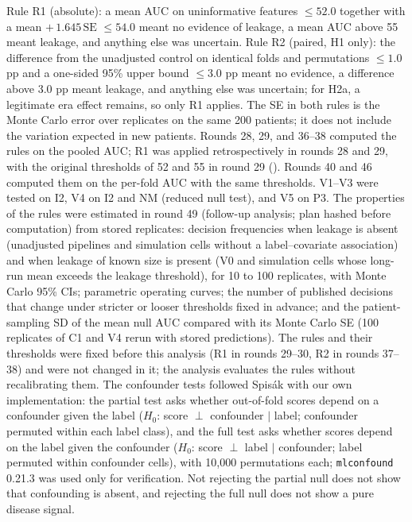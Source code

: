 

Rule R1 (absolute): a mean AUC on uninformative features $\leq 52.0$ together with a mean $+\,1.645\,\mathrm{SE}$ $\leq 54.0$ meant no evidence of leakage, a mean AUC above 55 meant leakage, and anything else was uncertain.
Rule R2 (paired, H1 only): the difference from the unadjusted control on identical folds and permutations $\leq 1.0$ pp and a one-sided 95\% upper bound $\leq 3.0$ pp meant no evidence, a difference above 3.0 pp meant leakage, and anything else was uncertain; for H2a, a legitimate era effect remains, so only R1 applies.
The SE in both rules is the Monte Carlo error over replicates on the same 200 patients; it does not include the variation expected in new patients.
Rounds 28, 29, and 36--38 computed the rules on the pooled AUC; R1 was applied retrospectively in rounds 28 and 29, with the original thresholds of 52 and 55 in round 29 (). Rounds 40 and 46 computed them on the per-fold AUC with the same thresholds.
V1--V3 were tested on I2, V4 on I2 and NM (reduced null test), and V5 on P3.
The properties of the rules were estimated in round 49 (follow-up analysis; plan hashed before computation) from stored replicates: decision frequencies when leakage is absent (unadjusted pipelines and simulation cells without a label--covariate association) and when leakage of known size is present (V0 and simulation cells whose long-run mean exceeds the leakage threshold), for 10 to 100 replicates, with Monte Carlo 95\% CIs; parametric operating curves; the number of published decisions that change under stricter or looser thresholds fixed in advance; and the patient-sampling SD of the mean null AUC compared with its Monte Carlo SE (100 replicates of C1 and V4 rerun with stored predictions). The rules and their thresholds were fixed before this analysis (R1 in rounds 29--30, R2 in rounds 37--38) and were not changed in it; the analysis evaluates the rules without recalibrating them.
The confounder tests followed Spis\'ak \cite{spisak2022} with our own implementation: the partial test asks whether out-of-fold scores depend on a confounder given the label ($H_0$: score $\perp$ confounder $\mid$ label; confounder permuted within each label class), and the full test asks whether scores depend on the label given the confounder ($H_0$: score $\perp$ label $\mid$ confounder; label permuted within confounder cells), with 10,000 permutations each; \texttt{mlconfound} 0.21.3 was used only for verification. Not rejecting the partial null does not show that confounding is absent, and rejecting the full null does not show a pure disease signal.

